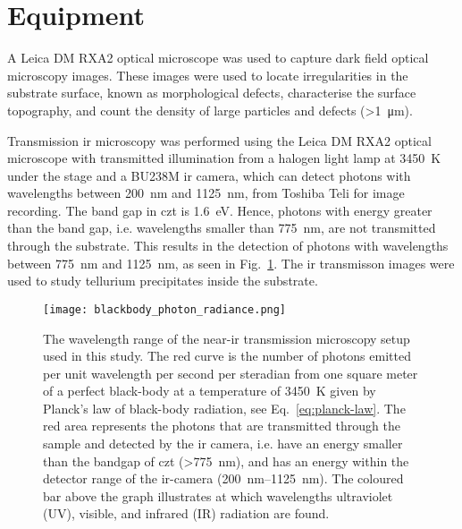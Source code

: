 \section{Equipment}


A Leica DM RXA2 optical microscope was used to capture dark field optical microscopy images. These images were used to locate irregularities in the substrate surface, known as morphological defects, characterise the surface topography, and count the density of large particles and defects (\SI{>1}{\micro\metre}).

Transmission \ac{ir} microscopy was performed using the Leica DM RXA2 optical microscope with transmitted illumination from a halogen light lamp at \SI{3450}{\kelvin} under the stage and a BU238M \ac{ir} camera, which can detect photons with wavelengths between \SI{200}{\nano\metre} and \SI{1125}{\nano\metre}, from Toshiba Teli for image recording. The band gap in \ac{czt} is \SI{1.6}{\electronvolt}. Hence, photons with energy greater than the band gap, i.e. wavelengths smaller than \SI{775}{\nano\metre}, are not transmitted through the substrate. This results in the detection of photons with wavelengths between \SI{775}{\nano\metre} and \SI{1125}{\nano\metre}, as seen in Fig.~\ref{fig:ir-range}. The \ac{ir} transmisson images were used to study tellurium precipitates inside the substrate. %

\begin{figure}[htbp]
    \centering
    \texttt{[image: blackbody\_photon\_radiance.png]}
    \caption[Graph showing the wavelength range of the near-\ac{ir} transmission microscopy setup.]{The wavelength range of the near-\ac{ir} transmission microscopy setup used in this study. The red curve is the number of photons emitted per unit wavelength per second per steradian from one square meter of a perfect black-body at a temperature of \SI{3450}{\kelvin} given by Planck's law of black-body radiation, see Eq.~\eqref{eq:planck-law}. The red area represents the photons that are transmitted through the sample and detected by the \ac{ir} camera, i.e. have an energy smaller than the bandgap of \ac{czt} (\SI{>775}{\nano\metre}),  and has an energy within the detector range of the \ac{ir}-camera (\SIrange{200}{1125}{\nano\metre}). The coloured bar above the graph illustrates at which wavelengths ultraviolet (UV), visible, and infrared (IR) radiation are found.}
    \label{fig:ir-range}
\end{figure}

